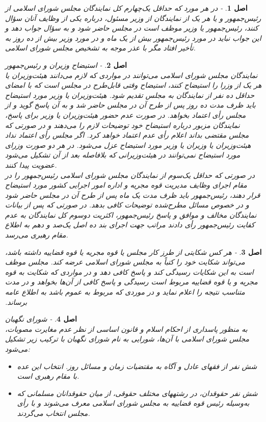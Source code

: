 \documentclass[12pt]{article}
\newtheorem{asl}{اصل}
\begin{document}
\begin{asl}- 
در هر مورد که حداقل یک‌چهارم کل نمایندگان مجلس شورای اسلامی از رئیس‌جمهور و یا هر یک از نمایندگان از وزیر مسئول، درباره یکی از وظایف آنان سؤال کنند، رئیس‌جمهور یا وزیر موظف است در مجلس حاضر شود و به سؤال جواب دهد و این جواب نباید در مورد رئیس‌جمهور بیش از یک ماه و در مورد وزیر بیش از ده روز به تأخیر افتاد مگر با عذر موجه به تشخیص مجلس شورای اسلامی. 
\end{asl}

\begin{asl}- 
استیضاح وزیران و رئیس‌جمهور 
\\
نمایندگان مجلس شورای اسلامی می‌توانند در مواردی که لازم می‌دانند هیئت‌وزیران یا هر یک از وزرا را استیضاح کنند، استیضاح وقتی قابل‌طرح در مجلس است که با امضای حداقل ده نفر از نمایندگان به مجلس تقدیم شود. هیئت‌وزیران یا وزیر مورد استیضاح باید ظرف مدت ده روز پس از طرح آن در مجلس حاضر شد و به آن پاسخ گوید و از مجلس رأی اعتماد بخواهد. در صورت عدم حضور هیئت‌وزیران یا وزیر برای پاسخ، نمایندگان مزبور درباره استیضاح خود توضیحات لازم را می‌دهند و در صورتی که مجلس مقتضی بداند اعلام رأی عدم اعتماد خواهد کرد. اگر مجلس رأی اعتماد نداد هیئت‌وزیران یا وزیران یا وزیر مورد استیضاح عزل می‌شود. در هر دو صورت وزرای مورد استیضاح نمی‌توانند در هیئت‌وزیرانی که بلافاصله بعد از آن تشکیل می‌شود عضویت پیدا کنند. 
\\
در صورتی که حداقل یک‌سوم از نمایندگان مجلس شورای اسلامی رئیس‌جمهور را در مقام اجرای وظایف مدیریت قوه مجریه و اداره امور اجرایی کشور مورد استیضاح قرار دهند، رئیس‌جمهور باید ظرف مدت یک ماه پس از طرح آن در مجلس حاضر شود و در خصوص مسائل مطرح‌شده توضیحات کافی بدهد. در صورتی که پس از بیانات نمایندگان مخالف و موافق و پاسخ رئیس‌جمهور، اکثریت دوسوم کل نمایندگان به عدم کفایت رئیس‌جمهور رأی دادند مراتب جهت اجرای بند ده اصل یک‌صد و دهم به اطلاع مقام رهبری می‌رسد. 

\end{asl}

\begin{asl}- 
هر کس شکایتی از طرز کار مجلس یا قوه مجریه یا قوه قضاییه داشته باشد، می‌تواند شکایت خود را کتباً به مجلس شورای اسلامی عرضه کند. مجلس موظف است به این شکایات رسیدگی کند و پاسخ کافی دهد و در مواردی که شکایت به قوه مجریه و یا قوه قضاییه مربوط است رسیدگی و پاسخ کافی از آن‌ها بخواهد و در مدت متناسب نتیجه را اعلام نماید و در موردی که مربوط به عموم باشد به اطلاع عامه برساند.‏
\end{asl}

\begin{asl}- 
شورای نگهبان 
\\
به منظور پاسداری از احکام اسلام و قانون اساسی از نظر عدم مغایرت مصوبات، مجلس شورای اسلامی با آن‌ها، شورایی به نام شورای نگهبان با ترکیب زیر تشکیل می‌شود:
\renewcommand{\labelitemi}{$-$}
\begin{itemize}
	\item 
شش نفر از فقهای عادل و آگاه به مقتضیات زمان و مسائل روز. انتخاب این عده با مقام رهبری است. 
	\item
	شش نفر حقوقدان، در رشته‏های مختلف حقوقی، از میان حقوقدانان مسلمانی که به‌وسیله رئیس قوه قضاییه به مجلس شورای اسلامی معرف می‌شوند و با رأی مجلس انتخاب می‌گردند.
\end{itemize}
\end{asl}
\end{document}
